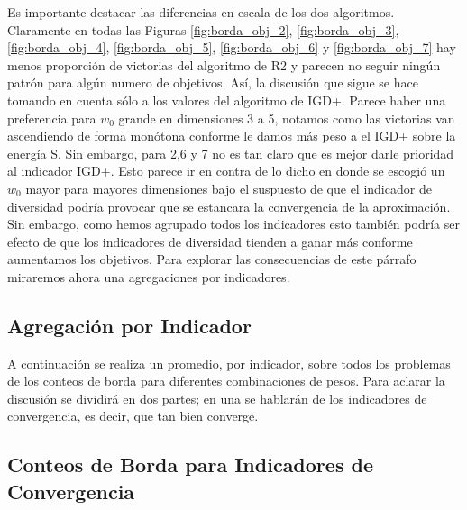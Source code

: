 Es importante destacar las diferencias en escala de los dos algoritmos. Claramente en todas las Figuras \ref{fig:borda_obj_2}, \ref{fig:borda_obj_3}, \ref{fig:borda_obj_4}, \ref{fig:borda_obj_5}, \ref{fig:borda_obj_6} y  \ref{fig:borda_obj_7} hay menos proporción de victorias del algoritmo de R2 y parecen no seguir ningún patrón para algún numero de objetivos. Así, la discusión que sigue se hace tomando en cuenta sólo a los valores del algoritmo de IGD+. 
Parece haber una preferencia para $w_0$ grande en dimensiones 3 a 5, notamos como las victorias van ascendiendo de forma monótona conforme le damos más peso a el IGD+ sobre la energía S. Sin embargo, para 2,6 y 7 no es tan claro que es mejor darle prioridad al indicador IGD+. Esto parece ir en contra de lo dicho en \cite{PFI} donde se escogió un $w_0$ mayor para mayores dimensiones bajo el suspuesto de que el indicador de diversidad podría provocar que se estancara la convergencia de la aproximación. Sin embargo, como hemos agrupado todos los indicadores esto también podría ser efecto de que los indicadores de diversidad tienden a ganar más conforme aumentamos los objetivos. Para explorar las consecuencias de este párrafo miraremos ahora una agregaciones por indicadores.

\subsection{Agregación por Indicador}

A continuación se realiza un promedio, por indicador, sobre todos los problemas de los conteos de borda para diferentes combinaciones de pesos. Para aclarar la discusión se dividirá en dos partes; en una se hablarán de los indicadores de convergencia, es decir, que tan bien converge. 



\subsection*{Conteos de Borda para Indicadores de Convergencia}

